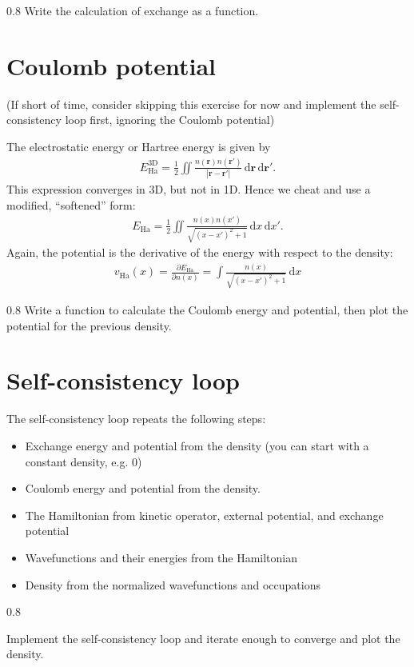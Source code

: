 \documentclass{article}
\newcommand{\exercise}[1]{
  \bigskip
  \begin{boxedminipage}[c]{0.8\linewidth}
  #1
  \end{boxedminipage}
  \bigskip
}
\newcommand{\dee}[0]{\mathrm d}
\newcommand{\idee}[0]{\,\dee}
\newcommand{\pdiff}[2]{\frac{\partial #1}{\partial #2}}
\begin{document}
\exercise{Write the calculation of exchange as a function.}

\section{Coulomb potential}
(If short of time, consider skipping this exercise for now and implement the
self-consistency loop first, ignoring the Coulomb potential)

The electrostatic energy or Hartree energy is given by
\begin{align}
  E_{\mathrm{Ha}}^{\mathrm{3D}} = \frac12 \iint \frac{n(\mathbf r)n(\mathbf r')}{|\mathbf r - \mathbf r'|}\idee \mathbf r \idee \mathbf r'.
\end{align}
This expression converges in 3D, but not in 1D.  Hence we cheat and use
a modified, ``softened'' form:
\begin{align}
E_{\mathrm{Ha}} = \frac12 \iint \frac{n(x) n(x')}{\sqrt{(x - x')^2 + 1}}
\idee x \idee x'.
\end{align}
Again, the potential is the derivative of the energy with respect to the
density:
\begin{align}
  v_{\mathrm{Ha}}(x) = \pdiff{E_{\mathrm{Ha}}}{n(x)} =
  \int \frac{n(x)}{\sqrt{(x - x')^2 + 1}} \idee x
\end{align}

\exercise{Write a function to calculate the Coulomb energy and potential,
  then plot the potential for the previous density.}

\section{Self-consistency loop}
The self-consistency loop repeats the following steps:
\begin{itemize}
\item Exchange energy and potential from the density (you can start with a
  constant density, e.g. 0)
\item Coulomb energy and potential from the density.
\item The Hamiltonian from kinetic operator, external potential,
  and exchange potential
\item Wavefunctions and their energies from the Hamiltonian
\item Density from the normalized wavefunctions and occupations
\end{itemize}


\exercise{
  Implement the self-consistency loop and iterate enough to converge
  and plot the density.
}
\end{document}
